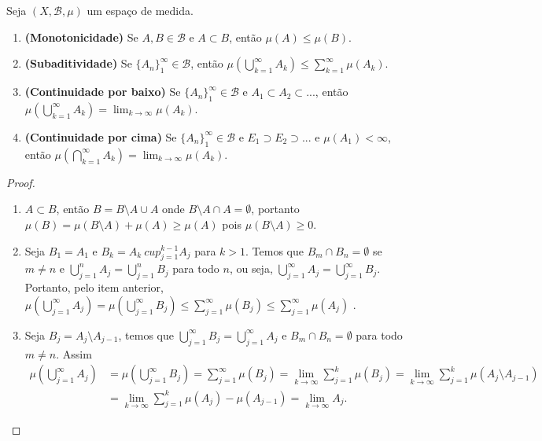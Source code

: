 \begin{teorema} \label{teo2.1}
    Seja $(X,\mathcal{B},\mu)$ um espaço de medida.

    \begin{enumerate}[label=(\roman*)]
        \item \textbf{(Monotonicidade)} Se $A,B \in \mathcal{B}$ e $A \subset B$, então $\mu(A) \leq \mu(B)$.

        \item \textbf{(Subaditividade)} Se $\{ A_n \}_1 ^{\infty} \in \mathcal{B}$, então $\mu(\bigcup _{k=1} ^{\infty} A_k) \leq \sum _{k=1} ^{\infty} \mu (A_k) $.
        
        \item \textbf{(Continuidade por baixo)} Se $\{ A_n \}_1 ^{\infty} \in \mathcal{B}$ e $A_1 \subset A_2 \subset ...$, então $\mu(\bigcup _{k=1} ^{\infty} A_k)= \lim _{k \longrightarrow \infty} \mu(A_k)  $.
        
        \item \textbf{(Continuidade por cima)} Se $\{ A_n \}_1 ^{\infty} \in \mathcal{B}$ e $E_1 \supset E_2 \supset ...$ e $\mu(A_1)< \infty$, então $\mu(\bigcap _{k=1} ^{\infty} A_k)= \lim _{k \longrightarrow \infty} \mu(A_k) $.
    \end{enumerate}

    \begin{proof}
        \begin{enumerate}[label=(\roman*)]
            \item $A \subset B$, então $B= B \setminus A \cup A$ onde $ B \setminus A \cap A = \emptyset$, portanto $\mu(B) =  \mu(B \setminus A) + \mu(A) \geq \mu(A)$ pois $\mu(B \setminus A) \geq 0$. 
            
            \item Seja $B_1=A_1$ e $B_k = A_k \ cup _{j=1} ^{k-1} A_j$ para $k>1$. Temos que $B_m \cap B_n = \emptyset$ se $m \neq n$ e $ \bigcup _{j=1} ^{n} A_j = \bigcup _{j=1} ^{n} B_j$  para todo $n$, ou seja, $ \bigcup _{j=1} ^{\infty} A_j = \bigcup _{j=1} ^{\infty} B_j$. Portanto, pelo item anterior, $ \mu(\bigcup _{j=1} ^{\infty} A_j) = \mu(\bigcup _{j=1} ^{\infty} B_j) \leq \sum _{j=1} ^{\infty} \mu(B_j) \leq \sum _{j=1} ^{\infty} \mu(A_j)$ .
            
            \item Seja $B_j = A_j \setminus A_{j-1}$, temos que $\bigcup _{j=1} ^\infty B_j = \bigcup _{j=1} ^\infty A_j $ e $B_m \cap B_n = \emptyset$ para todo $m \neq n$. Assim 
            \begin{align*}
                \mu(\bigcup _{j=1} ^\infty A_j) &= \mu(\bigcup _{j=1} ^\infty B_j) = \sum _{j=1} ^\infty \mu(B_j) 
                = \lim _{k \longrightarrow \infty} \sum _{j=1} ^k \mu(B_j) = 
                \lim _{k \longrightarrow \infty} \sum _{j=1} ^k \mu(A_j \setminus A_{j-1}) \\ 
                &= \lim _{k \longrightarrow \infty} \sum _{j=1} ^k \mu(A_j) - \mu(A_{j-1}) = \lim _{k \longrightarrow \infty} A_j.
            \end{align*}
            

\end{enumerate}
\end{proof}
\end{teorema}
